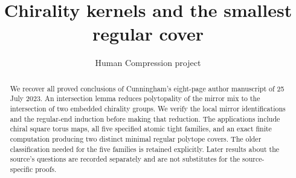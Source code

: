 
\title{Chirality kernels and the smallest regular cover}
\author{Human Compression project}
\maketitle
\begin{abstract}
We recover all proved conclusions of Cunningham's eight-page author manuscript of 25 July 2023. An intersection lemma reduces polytopality of the mirror mix to the intersection of two embedded chirality groups. We verify the local mirror identifications and the regular-end induction before making that reduction. The applications include chiral square torus maps, all five specified atomic tight families, and an exact finite computation producing two distinct minimal regular polytope covers. The older classification needed for the five families is retained explicitly. Later results about the source's questions are recorded separately and are not substitutes for the source-specific proofs.
\end{abstract}





